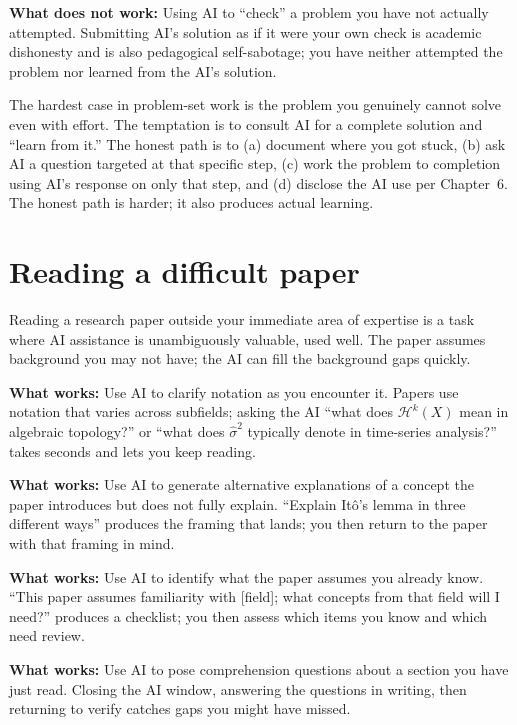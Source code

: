 \documentclass[11pt]{book}
\begin{document}
\textbf{What does not work:} Using AI to ``check'' a problem you have not actually attempted. Submitting AI's solution as if it were your own check is academic dishonesty and is also pedagogical self-sabotage; you have neither attempted the problem nor learned from the AI's solution.

\begin{watchout}
The hardest case in problem-set work is the problem you genuinely cannot solve even with effort. The temptation is to consult AI for a complete solution and ``learn from it.'' The honest path is to (a) document where you got stuck, (b) ask AI a question targeted at that specific step, (c) work the problem to completion using AI's response on only that step, and (d) disclose the AI use per Chapter~6. The honest path is harder; it also produces actual learning.
\end{watchout}

\section{Reading a difficult paper}

Reading a research paper outside your immediate area of expertise is a task where AI assistance is unambiguously valuable, used well. The paper assumes background you may not have; the AI can fill the background gaps quickly.

\textbf{What works:} Use AI to clarify notation as you encounter it. Papers use notation that varies across subfields; asking the AI ``what does $\mathcal{H}^k(X)$ mean in algebraic topology?'' or ``what does $\hat\sigma^2$ typically denote in time-series analysis?'' takes seconds and lets you keep reading.

\textbf{What works:} Use AI to generate alternative explanations of a concept the paper introduces but does not fully explain. ``Explain Itô's lemma in three different ways'' produces the framing that lands; you then return to the paper with that framing in mind.

\textbf{What works:} Use AI to identify what the paper assumes you already know. ``This paper assumes familiarity with [field]; what concepts from that field will I need?'' produces a checklist; you then assess which items you know and which need review.

\textbf{What works:} Use AI to pose comprehension questions about a section you have just read. Closing the AI window, answering the questions in writing, then returning to verify catches gaps you might have missed.
\end{document}
